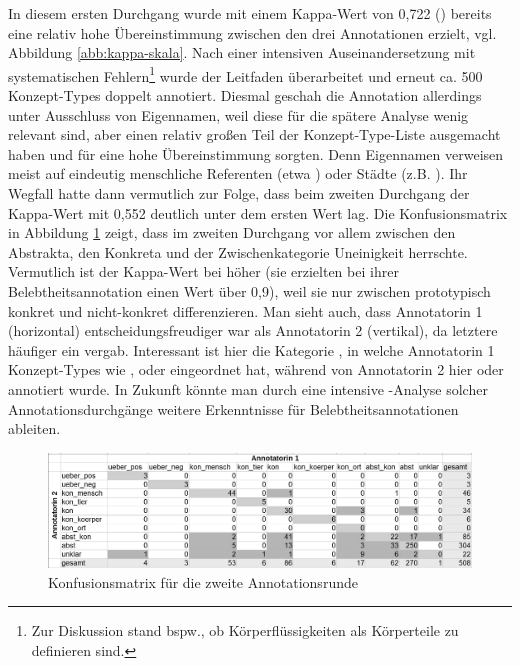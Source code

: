 In diesem ersten Durchgang wurde mit einem Kappa-Wert von 0,722 () bereits eine relativ hohe Übereinstimmung zwischen den drei Annotationen erzielt, vgl. Abbildung \ref{abb:kappa-skala}. 
Nach einer intensiven Auseinandersetzung mit systematischen Fehlern\footnote{Zur Diskussion stand bspw., ob Körperflüssigkeiten als Körperteile zu definieren sind.} wurde der Leitfaden überarbeitet und erneut ca. 500 Konzept-Types doppelt annotiert. Diesmal geschah die Annotation allerdings unter Ausschluss von Eigennamen, weil diese für die spätere Analyse wenig relevant sind, aber einen relativ großen Teil der Konzept-Type-Liste ausgemacht haben und für eine hohe Übereinstimmung sorgten. Denn Eigennamen verweisen meist auf eindeutig menschliche Referenten (etwa ) oder Städte (z.B. ).
Ihr Wegfall hatte dann vermutlich zur Folge, dass beim zweiten Durchgang der Kappa-Wert mit 0,552 deutlich unter dem ersten Wert lag. 
Die Konfusionsmatrix in Abbildung \ref{abb:confusion} zeigt, dass im zweiten Durchgang vor allem zwischen den Abstrakta, den Konkreta und der Zwischenkategorie  Uneinigkeit herrschte. 
Vermutlich ist der Kappa-Wert bei \textcite{Zaenen2004} höher (sie erzielten bei ihrer Belebtheitsannotation einen Wert über 0,9), weil sie nur zwischen prototypisch konkret und nicht-konkret differenzieren. Man sieht auch, dass Annotatorin 1 (horizontal) entscheidungsfreudiger war als Annotatorin 2 (vertikal), da letztere häufiger ein  vergab. Interessant ist hier die Kategorie , in welche Annotatorin 1 Konzept-Types wie ,  oder  eingeordnet hat, während von Annotatorin 2 hier  oder  annotiert wurde. In Zukunft könnte man durch eine intensive -Analyse solcher Annotationsdurchgänge weitere Erkenntnisse für Belebtheitsannotationen ableiten.  
 
\begin{figure}
\begin{center}
  \includegraphics[width=12 cm]{images/confusionsmatrix-neu-sw.jpg}
\caption {Konfusionsmatrix für die zweite Annotationsrunde}
\label{abb:confusion}
\end{center}
\end{figure} 

